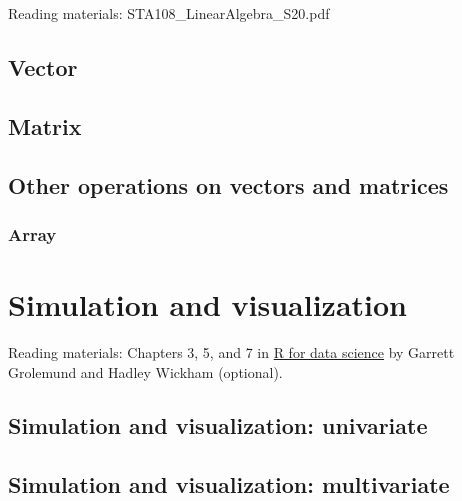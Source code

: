 \documentclass[12pt,]{book}
\begin{document}
Reading materials: STA108\_LinearAlgebra\_S20.pdf

\section{Vector}\label{vector}

\section{Matrix}\label{matrix}

\section{Other operations on vectors and
matrices}\label{other-operations-on-vectors-and-matrices}

\subsection{Array}\label{array}

\chapter{Simulation and visualization}\label{ch:sim}

Reading materials: Chapters 3, 5, and 7 in
\href{https://r4ds.had.co.nz/index.html}{R for data science} by Garrett
Grolemund and Hadley Wickham (optional).

\section{Simulation and visualization:
univariate}\label{simulation-and-visualization-univariate}

\section{Simulation and visualization:
multivariate}\label{simulation-and-visualization-multivariate}


\end{document}
